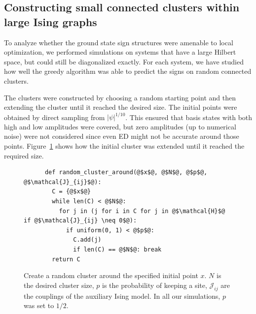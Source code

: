 \subsection{Constructing small connected clusters within large Ising graphs}

To analyze whether the ground state sign structures were amenable to local optimization, we performed simulations on systems that have a large Hilbert space, but could still be diagonalized exactly. For each system, we have studied how well the greedy algorithm was able to predict the signs on random connected clusters.

The clusters were constructed by choosing a random starting point and then extending the cluster until it reached the desired size. The initial points were obtained by direct sampling from $|\psi|^{1/10}$. This ensured that basis states with both high and low amplitudes were covered, but zero amplitudes (up to numerical noise) were not considered since even ED might not be accurate around those points. Figure~\ref{alg:random-cluster} shows how the initial cluster was extended until it reached the required size.

\begin{figure}
\begin{verbatim}
      def random_cluster_around(@$x$@, @$N$@, @$p$@, @$\mathcal{J}_{ij}$@):
        C = {@$x$@}
        while len(C) < @$N$@:
          for j in (j for i in C for j in @$\mathcal{H}$@ if @$\mathcal{J}_{ij} \neq 0$@):
            if uniform(0, 1) < @$p$@:
              C.add(j)
              if len(C) == @$N$@: break
        return C
\end{verbatim}
\vspace{-0.2cm}\caption{Create a random cluster around the specified initial point $x$. $N$ is the desired cluster size, $p$ is the probability of keeping a site, $\mathcal{J}_{ij}$ are the couplings of the auxiliary Ising model. In all our simulations, $p$ was set to $1/2$.}
\label{alg:random-cluster}
\end{figure}

